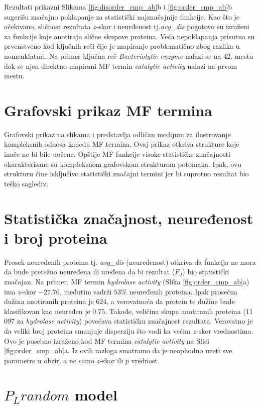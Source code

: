 Rezultati prikazni Slikama \ref{fig:disorder_cmp_ab}b i
\ref{fig:order_cmp_ab}b sugerišu značajno poklapanje za statistički
najznačajnije funkcije. Kao što je očekivano, sličnost rezultata $z$-skor i
neurđenost tj.\textit{avg\_dis} pogotovo su izraženi za funkcije koje anotiraju
slične skupove proteina. Veća nepoklapanja prisutna su prvenstveno kod ključnih
reči čije je mapiranje problematično zbog razlika u nomenklaturi. Na primer
ključna reč \textit{Bacteriolytic enzyme} nalazi se na 42. mestu dok se njen
direktno mapirani MF termin \textit{catalytic activity} nalazi na prvom mestu.

\section{Grafovski prikaz MF termina}

Grafovski prikaz na slikama  i  predstavlja
odličan medijum za ilustrovanje kompleksnih odnosa između MF termina. Ovaj
prikaz otkriva strukture koje inače ne bi bile uočene.  Opštije MF funkcije
visoke statističke značajnosti okarakterisane su kompleksnom grafovskom
strukturom potomaka. Ipak, ovu strukturu čine isključivo statistički značajni
termini jer bi suprotno rezultat bio  teško saglediv.

\section{Statistička značajnost, neuređenost i broj proteina}

Prosek neuređenih proteina tj. \textit{avg\_dis} (neuređenost) otkriva da
funkcija ne mora da bude pretežno neuređena ili uređena da bi rezultat ($F_J$)
bio statistički značajan.  Na primer, MF termin \textit{hydrolase activity}
(Slika \ref{fig:order_cmp_ab}a) ima $z$-skor $-27.76$, međutim sadrži $53\%$
neuređenih proteina. Ipak prosečna dužina anotiranih proteina je 624, a
verovatnoća da protein te dužine bude klasifikovan kao neuređen je 0.75.
Takođe, veličina skupa anotiranih proteina (11 097 za \textit{hydrolase
activity}) povećava statističku značajnost rezultata. Verovatno je da veliki
broj proteina smanjuje disperziju što vodi ka većim $z$-skor vrednostima.  Ovo
je posebno izraženo kod MF termina \textit{catalytic activity} na Slici
\ref{fig:order_cmp_ab}a.  Iz ovih razloga smatramo da je neophodno uzeti sve
parametre u obzir, a ne samo $z$-skor ili $p$ vrednost.

\section{$P_Lrandom$ model}

